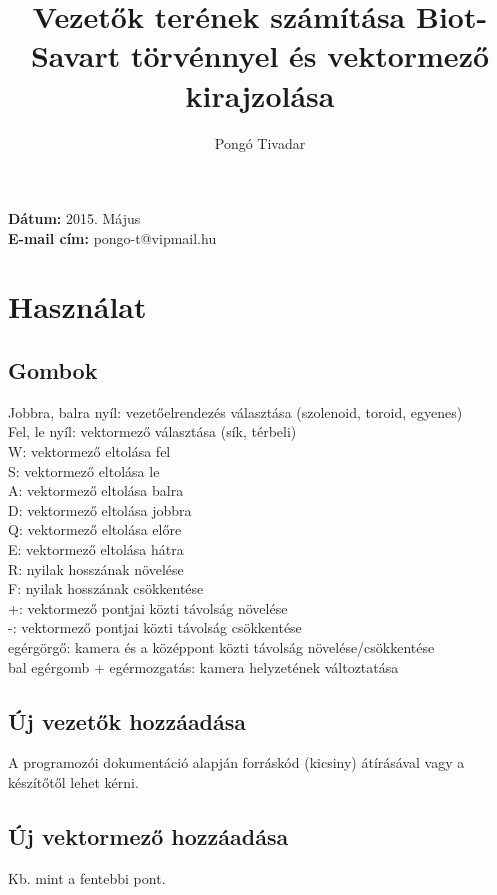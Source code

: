 \documentclass{article}
\title{Vezetők terének számítása Biot-Savart törvénnyel és vektormező kirajzolása}
\author{Pongó Tivadar}
\date{}
\begin{document}
\maketitle
\noindent
\textbf{Dátum:} 2015. Május \\
\textbf{E-mail cím:} pongo-t@vipmail.hu

\section*{Használat}
\subsection*{Gombok}
Jobbra, balra nyíl: vezetőelrendezés választása (szolenoid, toroid, egyenes) \\
Fel, le nyíl: vektormező választása (sík, térbeli) \\
W: vektormező eltolása fel \\
S: vektormező eltolása le \\
A: vektormező eltolása balra \\
D: vektormező eltolása jobbra \\
Q: vektormező eltolása előre \\
E: vektormező eltolása hátra \\
R: nyilak hosszának növelése \\
F: nyilak hosszának csökkentése \\
+: vektormező pontjai közti távolság növelése \\
-: vektormező pontjai közti távolság csökkentése \\
egérgörgő: kamera és a középpont közti távolság növelése/csökkentése \\
bal egérgomb + egérmozgatás: kamera helyzetének változtatása

\subsection*{Új vezetők hozzáadása}
A programozói dokumentáció alapján forráskód (kicsiny) átírásával vagy a készítőtől lehet kérni.

\subsection*{Új vektormező hozzáadása}
Kb. mint a fentebbi pont.
\end{document}
